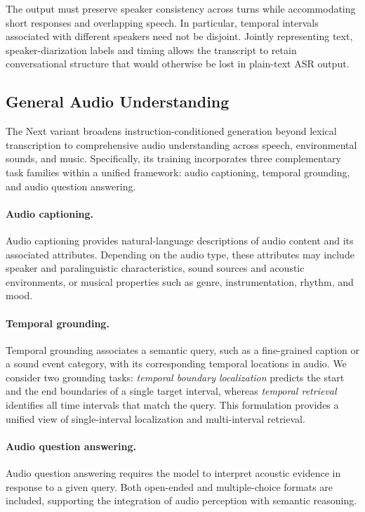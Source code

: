 \documentclass{article}
\begin{document}
The output must preserve speaker consistency across turns while accommodating short responses and overlapping speech. In particular, temporal intervals associated with different speakers need not be disjoint. Jointly representing text, speaker-diarization labels and timing allows the transcript to retain conversational structure that would otherwise be lost in plain-text ASR output.

\subsection{General Audio Understanding}
\label{subsec:general-audio-output}

The Next variant broadens instruction-conditioned generation beyond lexical transcription to comprehensive audio understanding across speech, environmental sounds, and music. Specifically, its training incorporates three complementary task families within a unified framework: audio captioning, temporal grounding, and audio question answering.
\paragraph{Audio captioning.}
Audio captioning provides natural-language descriptions of audio content and its associated attributes. Depending on the audio type, these attributes may include speaker and paralinguistic characteristics, sound sources and acoustic environments, or musical properties such as genre, instrumentation, rhythm, and mood.

\paragraph{Temporal grounding.}
Temporal grounding associates a semantic query, such as a fine-grained caption or a sound event category, with its corresponding temporal locations in audio. We consider two grounding tasks: \textit{temporal boundary localization} predicts the start and the end boundaries of a single target interval, whereas \textit{temporal retrieval} identifies all time intervals that match the query. This formulation provides a unified view of single-interval localization and multi-interval retrieval.

\paragraph{Audio question answering.}
Audio question answering requires the model to interpret acoustic evidence in response to a given query. Both open-ended and multiple-choice formats are included, supporting the integration of audio perception with semantic reasoning.
\end{document}
